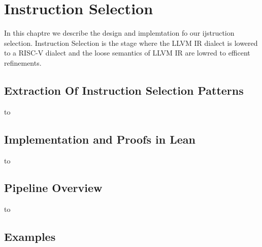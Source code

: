 \chapter{Instruction Selection}
In this chaptre we describe the design and implemtation fo our ijstruction selection. Instruction Selection is the stage where 
the LLVM IR dialect is lowered to a RISC-V dialect and the loose semantics of LLVM IR are lowred to efficent refinements.
\section{Extraction Of Instruction Selection Patterns}
to
\section{Implementation and Proofs in Lean}
to 

\section{Pipeline Overview}
to
\section{Examples}
